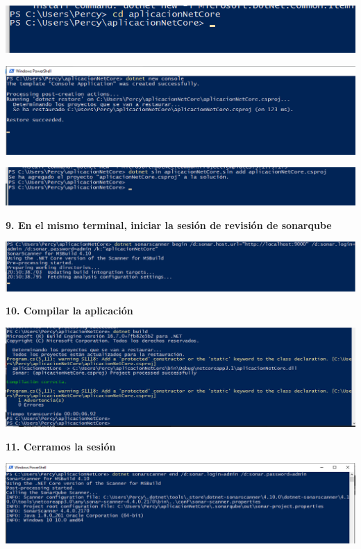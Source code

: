 \documentclass[12pt,letterpaper]{article}
\begin{document}
	 \begin{center}
		\includegraphics[width=15cm]{./Imagenes/11} 
	\end{center}
	
	 \begin{center}
		\includegraphics[width=15cm]{./Imagenes/12} 
	\end{center}

	\begin{center}
		\includegraphics[width=15cm]{./Imagenes/13} 
	\end{center}


\textbf{9. En el mismo terminal, iniciar la sesión de revisión de sonarqube}

   \begin{center}
		\includegraphics[width=15cm]{./Imagenes/14} 
	\end{center}


\textbf{10. Compilar la aplicación}

    \begin{center}
		\includegraphics[width=15cm]{./Imagenes/15} 
	\end{center}
	
	
\textbf{11. Cerramos la sesión}

    \begin{center}
		\includegraphics[width=15cm]{./Imagenes/16} 
	\end{center}


   
\end{document}
